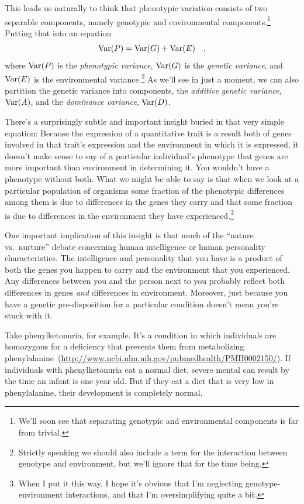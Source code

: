 \noindent This leads us naturally to think that phenotypic variation
consists of two separable components, namely genotypic and
environmental components.\footnote{We'll soon see that separating
genotypic and environmental components is far from trivial.} Putting
that into an equation
\[
\mbox{Var}(P) = \mbox{Var}(G) + \mbox{Var}(E) \quad , 
\]
where $\mbox{Var}(P)$ is the {\it phenotypic variance}, $\mbox{Var}(G)$ is the
{\it genetic variance}, and $\mbox{Var}(E)$ is the environmental
variance.\footnote{Strictly speaking we should also include a term for
the interaction between genotype and environment, but we'll ignore
that for the time being.} As we'll see in just a moment, we can also
partition the genetic variance into components, the {\it additive
genetic variance\/}, $\mbox{Var}(A)$, and the {\it dominance variance},
$\mbox{Var}(D)$.  

There's a surprisingly subtle and important insight buried in that
very simple equation: Because the expression of a quantitative trait
is a result both of genes involved in that trait's expression and the
environment in which it is expressed, it doesn't make sense to say of
a particular individual's phenotype that genes are more important than
environment in determining it. You wouldn't have a phenotype without
both. What we might be able to say is that when we look at a
particular population of organisms some fraction of the phenotypic
differences among them is due to differences in the genes they carry
and that some fraction is due to differences in the environment they
have experienced.\footnote{When I put it this way, I hope it's obvious
  that I'm neglecting genotype-environment interactions, and that I'm
  oversimplifying quite a bit.} 

One important implication of this insight is that much of the ``nature
vs.\ nurture'' debate concerning human intelligence or human
personality characteristics. The intelligence and personality that you
have is a product of both the genes you happen to carry and the
environment that you experienced. Any differences between you and the
person next to you probably reflect both differences in genes {\it
  and\/} differences in environment. Moreover, just because you have a
genetic pre-disposition for a particular condition doesn't mean you're
stuck with it.

Take phenylketonuria, for example. It's a condition in which
individuals are homozygous for a deficiency that prevents them from
metabolizing
phenylalanine~(\url{http://www.ncbi.nlm.nih.gov/pubmedhealth/PMH0002150/}). If
individuals with phenylketonuria eat a normal diet, severe mental can
result by the time an infant is one year old. But if they eat a diet
that is very low in phenylalanine, their development is completely
normal.

